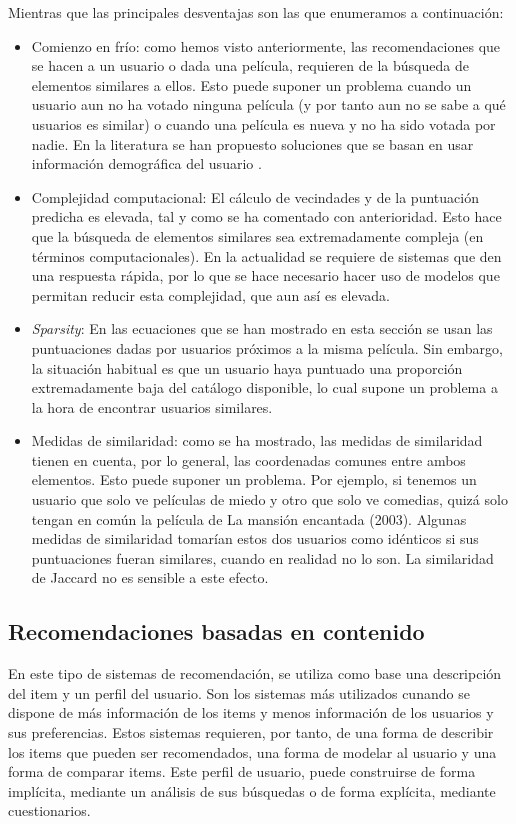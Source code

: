 Mientras que las principales desventajas son las que enumeramos a continuación:
\begin{itemize}
    \item Comienzo en frío: como hemos visto anteriormente, las recomendaciones que se hacen a un usuario o dada una película, requieren de la búsqueda de elementos similares a ellos. Esto puede suponer un problema cuando un usuario aun no ha votado ninguna película (y por tanto aun no se sabe a qué usuarios es similar) o cuando una película es nueva y no ha sido votada por nadie. En la literatura se han propuesto soluciones que se basan en usar información demográfica del usuario \cite{nguyen}.
    \item Complejidad computacional: El cálculo de vecindades y de la puntuación predicha es elevada, tal y como se ha comentado con anterioridad. Esto hace que la búsqueda de elementos similares sea extremadamente compleja (en términos computacionales). En la actualidad se requiere de sistemas que den una respuesta rápida, por lo que se hace necesario hacer uso de modelos que permitan reducir esta complejidad, que aun así es elevada.
    \item \textit{Sparsity}: En las ecuaciones que se han mostrado en esta sección se usan las puntuaciones dadas por usuarios próximos a la misma película. Sin embargo, la situación habitual es que un usuario haya puntuado una proporción extremadamente baja del catálogo disponible, lo cual supone un problema a la hora de encontrar usuarios similares.
    \item Medidas de similaridad: como se ha mostrado, las medidas de similaridad tienen en cuenta, por lo general, las coordenadas comunes entre ambos elementos. Esto puede suponer un problema. Por ejemplo, si tenemos un usuario que solo ve películas de miedo y otro que solo ve comedias, quizá solo tengan en común la película de La mansión encantada (2003). Algunas medidas de similaridad tomarían estos dos usuarios como idénticos si sus puntuaciones fueran similares, cuando en realidad no lo son. La similaridad de Jaccard no es sensible a este efecto.
\end{itemize}

\subsection{Recomendaciones basadas en contenido}

En este tipo de sistemas de recomendación, se utiliza como base una descripción del item y un perfil del usuario. Son los sistemas más utilizados cunando se dispone de más información de los items y menos información de los usuarios y sus preferencias. Estos sistemas requieren, por tanto, de una forma de describir los items que pueden ser recomendados, una forma de modelar al usuario y una forma de comparar items. Este perfil de usuario, puede construirse de forma implícita, mediante un análisis de sus búsquedas o de forma explícita, mediante cuestionarios.\\

